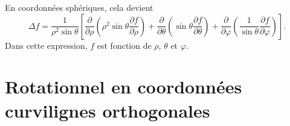 En coordonnées sphériques, cela devient
\begin{equation}        \label{EqLaplaceSphe}
    \Delta f=\frac{1}{ \rho^2\sin\theta }\left[ \frac{ \partial  }{ \partial \rho }\left( \rho^2\sin\theta\frac{ \partial f }{ \partial \rho } \right)+\frac{ \partial  }{ \partial \theta }\left( \sin\theta\frac{ \partial f }{ \partial \theta } \right)+\frac{ \partial  }{ \partial \varphi }\left( \frac{1}{ \sin\theta }\frac{ \partial f }{ \partial \varphi } \right) \right].
\end{equation}
Dans cette expression, $f$ est fonction de $\rho$, $\theta$ et $\varphi$.

\section{Rotationnel en coordonnées curvilignes orthogonales}

